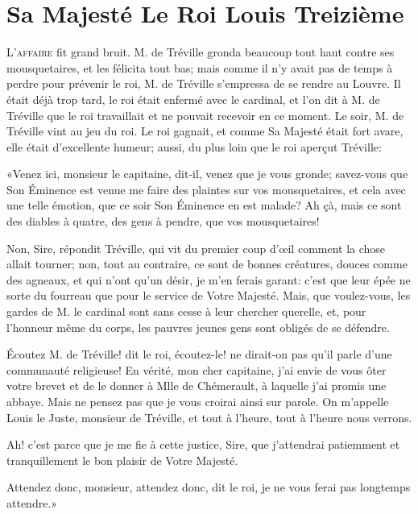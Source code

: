
\chapter{Sa Majesté Le Roi Louis Treizième} 

\lettrine{L}{'affaire} fit grand bruit. M. de Tréville gronda beaucoup tout haut contre ses mousquetaires, et les félicita tout bas; mais comme il n'y avait pas de temps à perdre pour prévenir le roi, M. de Tréville s'empressa de se rendre au Louvre. Il était déjà trop tard, le roi était enfermé avec le cardinal, et l'on dit à M. de Tréville que le roi travaillait et ne pouvait recevoir en ce moment. Le soir, M. de Tréville vint au jeu du roi. Le roi gagnait, et comme Sa Majesté était fort avare, elle était d'excellente humeur; aussi, du plus loin que le roi aperçut Tréville: 

«Venez ici, monsieur le capitaine, dit-il, venez que je vous gronde; savez-vous que Son Éminence est venue me faire des plaintes sur vos mousquetaires, et cela avec une telle émotion, que ce soir Son Éminence en est malade? Ah çà, mais ce sont des diables à quatre, des gens à pendre, que vos mousquetaires! 

\speak  Non, Sire, répondit Tréville, qui vit du premier coup d'œil comment la chose allait tourner; non, tout au contraire, ce sont de bonnes créatures, douces comme des agneaux, et qui n'ont qu'un désir, je m'en ferais garant: c'est que leur épée ne sorte du fourreau que pour le service de Votre Majesté. Mais, que voulez-vous, les gardes de M. le cardinal sont sans cesse à leur chercher querelle, et, pour l'honneur même du corps, les pauvres jeunes gens sont obligés de se défendre. 

\speak  Écoutez M. de Tréville! dit le roi, écoutez-le! ne dirait-on pas qu'il parle d'une communauté religieuse! En vérité, mon cher capitaine, j'ai envie de vous ôter votre brevet et de le donner à Mlle de Chémerault, à laquelle j'ai promis une abbaye. Mais ne pensez pas que je vous croirai ainsi sur parole. On m'appelle Louis le Juste, monsieur de Tréville, et tout à l'heure, tout à l'heure nous verrons. 

\speak  Ah! c'est parce que je me fie à cette justice, Sire, que j'attendrai patiemment et tranquillement le bon plaisir de Votre Majesté. 

\speak  Attendez donc, monsieur, attendez donc, dit le roi, je ne vous ferai pas longtemps attendre.» 

